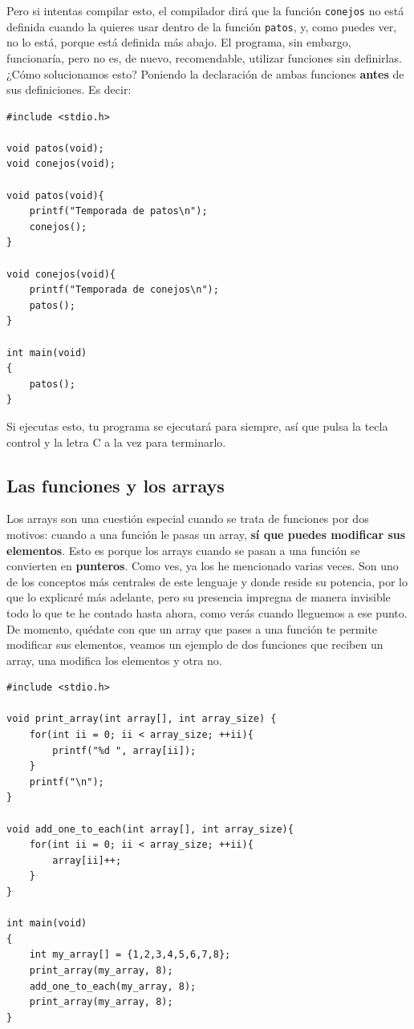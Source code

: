 \documentclass[a4paper]{article}
\begin{document}
Pero si intentas compilar esto, el compilador dirá que la función \verb!conejos!
no está definida cuando la quieres usar dentro de la función \verb!patos!, y,
como puedes ver, no lo está, porque está definida más abajo. El programa, sin
embargo, funcionaría, pero no es, de nuevo, recomendable, utilizar funciones
sin definirlas.
¿Cómo solucionamos
esto? Poniendo la declaración de ambas funciones \textbf{antes} de sus
definiciones. Es decir:


\noindent
\begin{minipage}[H]{\linewidth}
\mbox{}
\begin{lstlisting}[style=C, label={lst:cyclicFunctions},
caption={Declaración separa de definición}]
#include <stdio.h>

void patos(void);
void conejos(void);

void patos(void){
    printf("Temporada de patos\n");
    conejos();
}

void conejos(void){
    printf("Temporada de conejos\n");
    patos();
}

int main(void)
{
    patos();
}
\end{lstlisting}
\end{minipage}


Si ejecutas esto, tu programa se ejecutará para siempre, así que pulsa la tecla
control y la letra C a la vez para terminarlo.

\subsection{Las funciones y los arrays}
Los arrays son una cuestión especial cuando se trata de funciones por dos
motivos: cuando a una función le pasas un array, \textbf{sí que puedes modificar
sus elementos}. Esto es porque los arrays cuando se pasan a una función se
convierten en \textbf{punteros}. Como ves, ya los he mencionado varias veces.
Son uno de los conceptos más centrales de este lenguaje y donde reside su
potencia, por lo que lo explicaré más adelante, pero su presencia impregna
de manera invisible todo lo que te he contado hasta ahora, como verás cuando
lleguemos a ese punto. De momento, quédate con que un array que pases a una
función te permite modificar sus elementos, veamos un ejemplo de dos funciones
que reciben un array, una modifica los elementos y otra no.


\noindent
\begin{minipage}[H]{\linewidth}
\mbox{}
\begin{lstlisting}[style=C, label={lst:arraysAndFunctions},
caption={Uso de arrays en funciones}]
#include <stdio.h>

void print_array(int array[], int array_size) {
    for(int ii = 0; ii < array_size; ++ii){
        printf("%d ", array[ii]);
    }
    printf("\n");
}

void add_one_to_each(int array[], int array_size){
    for(int ii = 0; ii < array_size; ++ii){
        array[ii]++;
    }
}

int main(void)
{
    int my_array[] = {1,2,3,4,5,6,7,8};
    print_array(my_array, 8);
    add_one_to_each(my_array, 8);
    print_array(my_array, 8);
}
\end{lstlisting}
\end{minipage}
\end{document}
